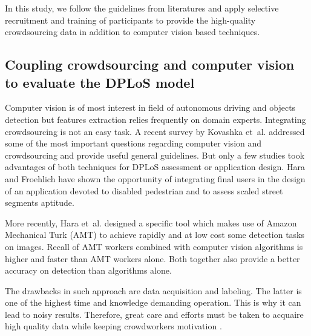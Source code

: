 \documentclass[10pt,conference,a4paper]{IEEEtran}
\begin{document}
In this study, we follow the guidelines from literatures and apply selective recruitment and training of participants to provide the high-quality crowdsourcing data in addition to computer vision based techniques.

\subsection{Coupling crowdsourcing and computer vision to evaluate the DPLoS model}
Computer vision is of most interest in field of autonomous driving and objects detection but features extraction relies frequently on domain experts. Integrating crowdsourcing is not an easy task. A recent survey by Kovashka et~al. \cite{kovashka2016crowdsourcing} addressed some of the most important questions regarding computer vision and crowdsourcing and provide useful general guidelines. But only a few studies took advantages of both techniques for DPLoS assessment or application design.
Hara and Froehlich \cite{hara_feasibility_2012}
have shown the opportunity of integrating final users in the design of an application devoted to disabled pedestrian and to assess scaled street segments aptitude.

More recently, Hara et~al. \cite{hara_tohme:_2014,hara_characterizing_2015} designed a specific tool which makes use of Amazon Mechanical Turk (AMT) to achieve rapidly and at low cost some detection tasks on images. Recall of AMT workers combined with computer vision algorithms is higher and faster than AMT workers alone. Both together also provide a better accuracy on detection than algorithms alone.

The drawbacks in such approach are data acquisition and labeling. The latter is one of the highest time and knowledge demanding operation. This is why it can lead to noisy results. Therefore, great care and efforts must be taken to acquaire high quality data while keeping crowdworkers motivation
\cite{von2006peekaboom}.
\end{document}
